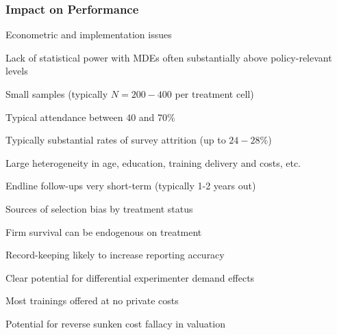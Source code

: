 \documentclass[hideothersubsections, usenames,dvipsnames,11pt]{beamer}
\newenvironment{itemize_2pt}{\itemize\addtolength{\itemsep}{2pt}}{\enditemize}
\begin{document}
\begin{frame}
\frametitle{Impact on Performance}

Econometric and implementation issues \citep{McKenzie2014}
	\begin{itemize_2pt}
		\item \textcolor{bdf}{Lack of statistical power} with MDEs often substantially above policy-relevant levels
		\begin{itemize_2pt}	
			\item Small samples (typically $N=200-400$ per treatment cell)
			\item Typical attendance between 40 and 70\%
			\item Typically substantial rates of survey attrition (up to $24-28\%$)
			\item Large heterogeneity in age, education, training delivery and costs, etc.
		\end{itemize_2pt}
		
		\pause
		
		\item Endline follow-ups \textcolor{bdf}{very short-term} (typically 1-2 years out)
		
		\item Sources of \textcolor{bdf}{selection bias} by treatment status
		\begin{itemize_2pt}	
			\item Firm survival can be endogenous on treatment
			\item Record-keeping likely to increase reporting accuracy
			\item Clear potential for differential experimenter demand effects
		\end{itemize_2pt}
		
		\item Most trainings offered at \textcolor{bdf}{no private costs}
		\begin{itemize_2pt}
			\item Potential for reverse sunken cost fallacy in valuation \citep[see,][]{Maffioli2020}
		\end{itemize_2pt}
		
	
	\end{itemize_2pt}
\end{frame}
\end{document}
